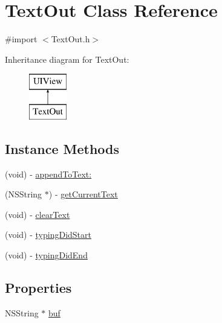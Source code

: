 \hypertarget{interface_text_out}{\section{Text\-Out Class Reference}
\label{interface_text_out}
}


{\ttfamily \#import $<$Text\-Out.\-h$>$}

Inheritance diagram for Text\-Out\-:\begin{figure}[H]
\begin{center}
\leavevmode
\includegraphics[height=2.000000cm]{interface_text_out}
\end{center}
\end{figure}
\subsection*{Instance Methods}
\begin{DoxyCompactItemize}
\item 
(void) -\/ \hyperlink{interface_text_out_a08e9c78a79c47ca503b5020faab0b38d}{append\-To\-Text\-:}
\item 
(N\-S\-String $\ast$) -\/ \hyperlink{interface_text_out_a86c52f51cb25c6262851dcb799bcfba5}{get\-Current\-Text}
\item 
(void) -\/ \hyperlink{interface_text_out_ae41e4a669baab71307b4463495c36d61}{clear\-Text}
\item 
(void) -\/ \hyperlink{interface_text_out_aea256a2143f7c01b0b6aabc1de886534}{typing\-Did\-Start}
\item 
(void) -\/ \hyperlink{interface_text_out_aa78bd820b66e92fe213f86845d579c90}{typing\-Did\-End}
\end{DoxyCompactItemize}
\subsection*{Properties}
\begin{DoxyCompactItemize}
\item 
N\-S\-String $\ast$ \hyperlink{interface_text_out_ac28231e0d988ba8618f000402c00bf89}{buf}
\end{DoxyCompactItemize}


